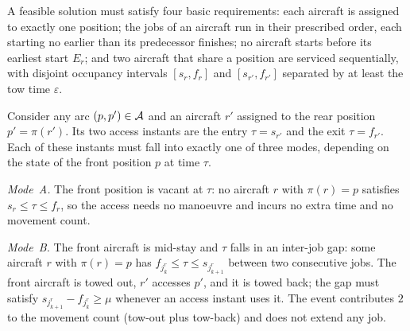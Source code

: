 A feasible solution must satisfy four basic requirements: each aircraft is
assigned to exactly one position; the jobs of an aircraft run in their
prescribed order, each starting no earlier than its predecessor finishes;
no aircraft starts before its earliest start $E_r$; and two aircraft that
share a position are serviced sequentially, with disjoint occupancy
intervals $[s_r, f_r]$ and $[s_{r'}, f_{r'}]$ separated by at least the tow
time $\varepsilon$.


\label{subsec:access}

Consider any arc $(p, p') \in \mathcal{A}$ and an aircraft $r'$ assigned to
the rear position $p' = \pi(r')$.  Its two access instants are the
entry $\tau = s_{r'}$ and the exit $\tau = f_{r'}$.  Each of these
instants must fall into exactly one of three modes, depending on the
state of the front position $p$ at time $\tau$.

\emph{Mode~A.}  The front position is vacant at $\tau$: no aircraft $r$
with $\pi(r) = p$ satisfies $s_r \le \tau \le f_r$, so the access needs
no manoeuvre and incurs no extra time and no movement count.

\emph{Mode~B.}  The front aircraft is mid-stay and $\tau$ falls in an
inter-job gap: some aircraft $r$ with $\pi(r) = p$ has
$f_{j^r_k} \le \tau \le s_{j^r_{k+1}}$ between two consecutive jobs.
The front aircraft is towed out, $r'$ accesses $p'$, and it is towed
back; the gap must satisfy $s_{j^r_{k+1}} - f_{j^r_k} \ge \mu$ whenever
an access instant uses it.  The event contributes $2$ to the movement
count (tow-out plus tow-back) and does not extend any job.


